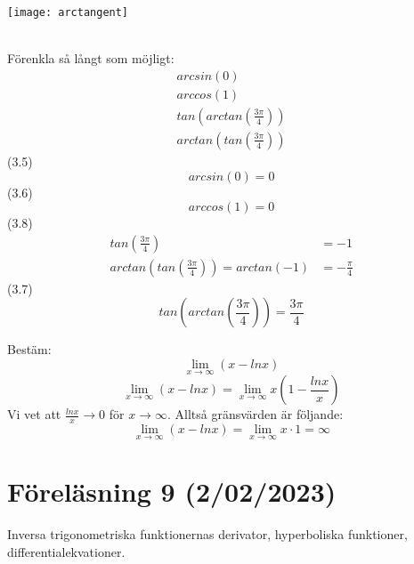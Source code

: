 \documentclass{report}
\begin{document}
\begin{center}
\texttt{[image: arctangent]}
\end{center}
\dotfill\\
\qs{}
{
Förenkla så långt som möjligt:
\begin{align}
arcsin(0)\\
arccos(1)\\
tan(arctan( \frac{3 \pi}{4} ))\\
arctan(tan( \frac{3\pi}{4})) 
\end{align}
}
\sol (3.5)
\begin{equation*}
arcsin(0) = 0
\end{equation*}
\sol (3.6)
\begin{equation*}
arccos(1) = 0
\end{equation*}
\sol (3.8)
\begin{align*}
tan( \frac{3\pi}{4} ) &= -1\\
arctan(tan( \frac{3\pi}{4} )) = arctan(-1) &= - \frac{\pi}{4} 
\end{align*}
\sol (3.7)
\begin{equation*}
tan(arctan( \frac{3\pi}{4} )) = \frac{3\pi}{4} 
\end{equation*}

\vspace{20pt}
\qs{}
{
Bestäm:
\begin{equation*}
\lim_{x \to \infty} (x - lnx)
\end{equation*}
}
\sol
\begin{equation*}
\lim_{x \to \infty} (x - lnx) = \lim_{x \to \infty} x(1- \frac{lnx}{x} )
\end{equation*}
Vi vet att $ \frac{lnx}{x} \to 0 $ för $ x \to \infty $. Alltså gränsvärden är följande:
\begin{equation*}
\lim_{x \to \infty} (x-lnx) = \lim_{x \to \infty} x \cdot 1 = \infty
\end{equation*}

\pagebreak

\section{Föreläsning 9 (2/02/2023)}
Inversa trigonometriska funktionernas derivator, hyperboliska funktioner, differentialekvationer.\\\\
\end{document}
